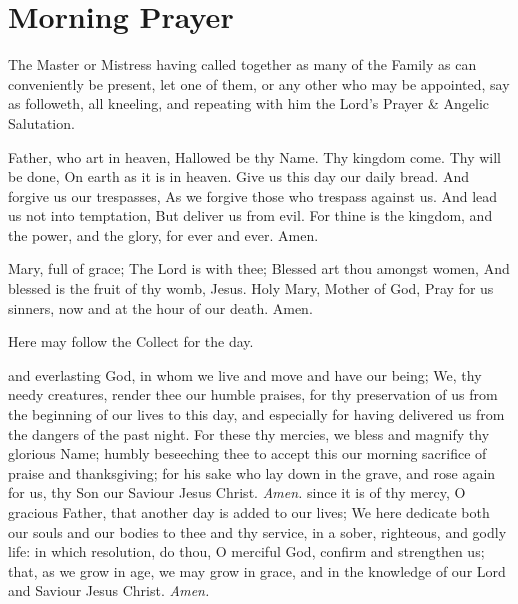 \fancyhead[RO,LE]{}\label{Family}
\fancyhead[RE,LO]{}
\section*{Morning Prayer}
\begin{secrubric}
    The Master or Mistress having called together as many of the Family as can conveniently be present, let one of them, or any other who may be appointed, say as followeth, all kneeling, and repeating with him the Lord's Prayer \& Angelic Salutation.
\end{secrubric}
 Father, who art in heaven, Hallowed be thy Name. Thy kingdom come. Thy will be done, On earth as it is in heaven. Give us this day our daily bread. And forgive us our trespasses, As we forgive those who trespass against us. And lead us not into temptation, But deliver us from evil. For thine is the kingdom, and the power, and the glory, for ever and ever. Amen.\par
{} Mary, full of grace; The Lord is with thee; Blessed art thou amongst women, And blessed is the fruit of thy womb, Jesus. Holy Mary, Mother of God, Pray for us sinners, now and at the hour of our death. Amen.
\begin{rubric}
    Here may follow the Collect for the day.
\end{rubric}
 and everlasting God, in whom we live and move and have our being; We, thy needy creatures, render thee our humble praises, for thy preservation of us from the beginning of our lives to this day, and especially for having delivered us from the dangers of the past night. For these thy mercies, we bless and magnify thy glorious Name; humbly beseeching thee to accept this our morning sacrifice of praise and thanksgiving; for his sake who lay down in the grave, and rose again for us, thy Son our Saviour Jesus Christ. \textit{Amen.}
 since it is of thy mercy, O gracious Father, that another day is added to our lives; We here dedicate both our souls and our bodies to thee and thy service, in a sober, righteous, and godly life: in which resolution, do thou, O merciful God, confirm and strengthen us; that, as we grow in age, we may grow in grace, and in the knowledge of our Lord and Saviour Jesus Christ. \textit{Amen.}

